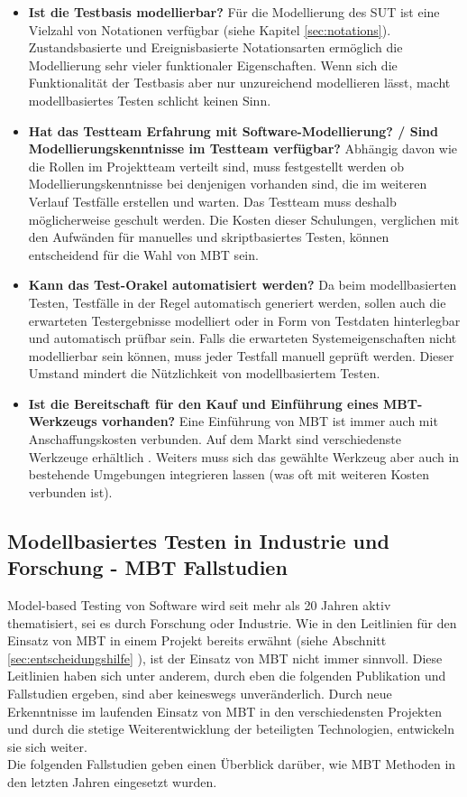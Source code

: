 \begin{itemize}
\item \textbf{Ist die Testbasis modellierbar?}
Für die Modellierung des SUT ist eine Vielzahl von Notationen verfügbar (siehe Kapitel \ref{sec:notations}). Zustandsbasierte und Ereignisbasierte Notationsarten ermöglich die Modellierung sehr vieler funktionaler Eigenschaften. Wenn sich die Funktionalität der Testbasis aber nur unzureichend modellieren lässt, macht modellbasiertes Testen schlicht keinen Sinn.
\item \textbf{Hat das Testteam Erfahrung mit Software-Modellierung? / Sind Modellierungskenntnisse im Testteam verfügbar?}
Abhängig davon wie die Rollen im Projektteam verteilt sind, muss festgestellt werden ob Modellierungskenntnisse bei denjenigen vorhanden sind, die im weiteren Verlauf Testfälle erstellen und warten. Das Testteam muss deshalb möglicherweise geschult werden. Die Kosten dieser Schulungen, verglichen mit den Aufwänden für manuelles und skriptbasiertes Testen, können entscheidend für die Wahl von MBT sein.
\item \textbf{Kann das Test-Orakel automatisiert werden?}
Da beim modellbasierten Testen, Testfälle in der Regel automatisch generiert werden, sollen auch die erwarteten Testergebnisse modelliert oder in Form von Testdaten hinterlegbar und automatisch prüfbar sein. Falls die erwarteten Systemeigenschaften nicht modellierbar sein können, muss jeder Testfall manuell geprüft werden. Dieser Umstand mindert die Nützlichkeit von modellbasiertem Testen.
\item \textbf{Ist die Bereitschaft für den Kauf und Einführung eines MBT-Werkzeugs vorhanden?}
Eine Einführung von MBT ist immer auch mit Anschaffungskosten verbunden. Auf dem Markt sind verschiedenste Werkzeuge erhältlich . Weiters muss sich das gewählte Werkzeug aber auch in bestehende Umgebungen integrieren lassen (was oft mit weiteren Kosten verbunden ist).
\end{itemize}

\subsection{Modellbasiertes Testen in Industrie und Forschung - MBT Fallstudien}

Model-based Testing von Software wird seit mehr als 20 Jahren aktiv thematisiert\cite{utting_practical_2007}, sei es durch Forschung oder Industrie. Wie in den Leitlinien für den Einsatz von MBT in einem Projekt bereits erwähnt (siehe Abschnitt \ref{sec:entscheidungshilfe} ), ist der Einsatz von MBT nicht immer sinnvoll. Diese Leitlinien haben sich unter anderem, durch eben die folgenden Publikation und Fallstudien ergeben, sind aber keineswegs unveränderlich. Durch neue Erkenntnisse im laufenden Einsatz von MBT in den verschiedensten Projekten und durch die stetige Weiterentwicklung der beteiligten Technologien, entwickeln sie sich weiter.\\
Die folgenden Fallstudien geben einen Überblick darüber, wie MBT Methoden in den letzten Jahren eingesetzt wurden.

